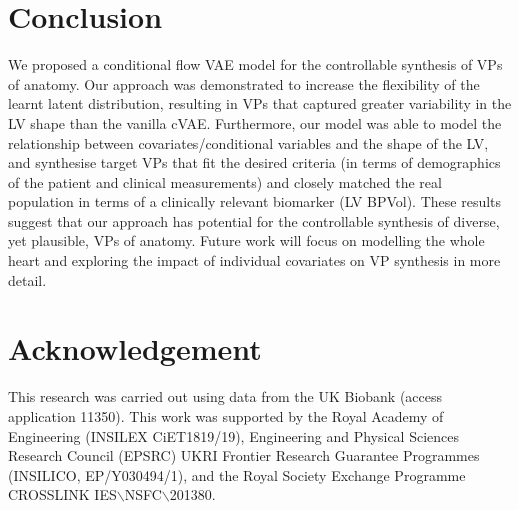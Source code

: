 \documentclass[runningheads]{llncs}
\begin{document}
\section{Conclusion}
We proposed a conditional flow VAE model for the controllable synthesis of VPs of anatomy. Our approach was demonstrated to increase the flexibility of the learnt latent distribution, resulting in VPs that captured greater variability in the LV shape than the vanilla cVAE. Furthermore, our model was able to model the relationship between covariates/conditional variables and the shape of the LV, and synthesise target VPs that fit the desired criteria (in terms of demographics of the patient and clinical measurements) and closely matched the real population in terms of a clinically relevant biomarker (LV BPVol). These results suggest that our approach has potential for the controllable synthesis of diverse, yet plausible, VPs of anatomy. Future work will focus on modelling the whole heart and exploring the impact of individual covariates on VP synthesis in more detail.

\section{Acknowledgement}
This research was carried out using data from the UK Biobank (access application 11350). This work was supported by the Royal Academy of Engineering (INSILEX CiET1819/19), Engineering and Physical Sciences Research Council (EPSRC) UKRI Frontier Research Guarantee Programmes (INSILICO, EP/Y030494/1), and the Royal Society Exchange Programme CROSSLINK  IES$\backslash$NSFC$\backslash$201380.




%

{}
\end{document}
